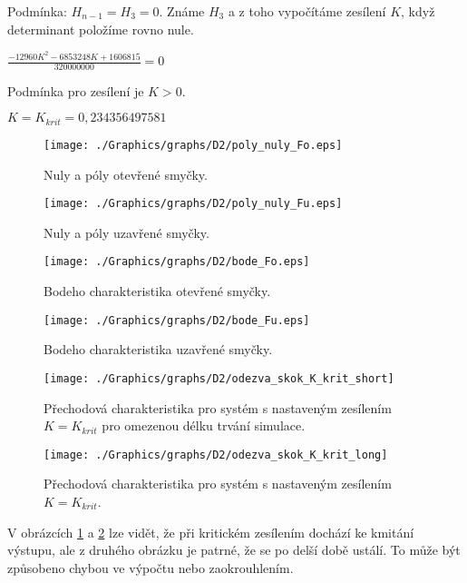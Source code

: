 \documentclass{article}
\begin{document}
\begin{center}
			\bigskip
			 Podmínka: $H_{n-1}=H_3=0$. Známe $H_3$ a z toho vypočítáme zesílení $K$, když determinant položíme rovno nule.
			 
			 \bigskip
			 
			 $\frac{-12960K^2-6853248K+1606815}{320000000}=0$
			 
			 \bigskip
			 
			 Podmínka pro zesílení je $K > 0$.
			 
			 \bigskip
			 
			 $K=K_{krit}=0,234356497581$
			\end{center}
				\begin{figure}[H]
					\centering
					\texttt{[image: ./Graphics/graphs/D2/poly\_nuly\_Fo.eps]}
					\caption{Nuly a póly otevřené smyčky.}
				\end{figure}
				\begin{figure}[H]
					\centering
					\texttt{[image: ./Graphics/graphs/D2/poly\_nuly\_Fu.eps]}
					\caption{Nuly a póly uzavřené smyčky.}
				\end{figure}
				\begin{figure}[H]
					\centering
					\texttt{[image: ./Graphics/graphs/D2/bode\_Fo.eps]}
					\caption{Bodeho charakteristika otevřené smyčky.}
				\end{figure}
				\begin{figure}[H]
					\centering
					\texttt{[image: ./Graphics/graphs/D2/bode\_Fu.eps]}
					\caption{Bodeho charakteristika uzavřené smyčky.}
				\end{figure}
				\begin{figure}[H]
					\centering
					\texttt{[image: ./Graphics/graphs/D2/odezva\_skok\_K\_krit\_short]}
					\caption{Přechodová charakteristika pro systém s nastaveným zesílením \(K=K_{krit}\) pro omezenou délku trvání simulace.}
					\label{pic:D2_krit_zes1}
				\end{figure}
				\begin{figure}[H]
					\centering
					\texttt{[image: ./Graphics/graphs/D2/odezva\_skok\_K\_krit\_long]}
					\caption{Přechodová charakteristika pro systém s nastaveným zesílením \(K=K_{krit}\).}
					\label{pic:D2_krit_zes2}
				\end{figure}
				V obrázcích \ref{pic:D2_krit_zes1} a \ref{pic:D2_krit_zes2} lze vidět, že při kritickém zesílením dochází ke kmitání výstupu, ale z druhého obrázku je patrné, že se po delší době ustálí. To může být způsobeno chybou ve výpočtu nebo zaokrouhlením.
\end{document}
